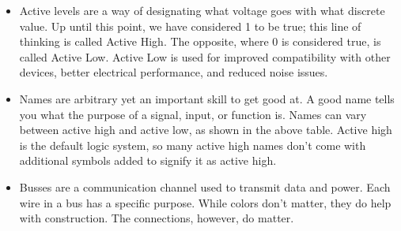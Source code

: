 \documentclass[10pt,a4paper]{article}
\begin{document}
\begin{itemize}
\item Active levels are a way of designating what voltage goes with what discrete value. Up until this point, we have considered 1 to be true; this line of thinking is called Active High. The opposite, where 0 is considered true, is called Active Low. Active Low is used for improved compatibility with other devices, better electrical performance, and reduced noise issues.
\item Names are arbitrary yet an important skill to get good at. A good name tells you what the purpose of a signal, input, or function is. Names can vary between active high and active low, as shown in the above table. Active high is the default logic system, so many active high names don't come with additional symbols added to signify it as active high.
\item Busses are a communication channel used to transmit data and power. Each wire in a bus has a specific purpose. While colors don't matter, they do help with construction. The connections, however, do matter.
\end{itemize}
\end{document}
